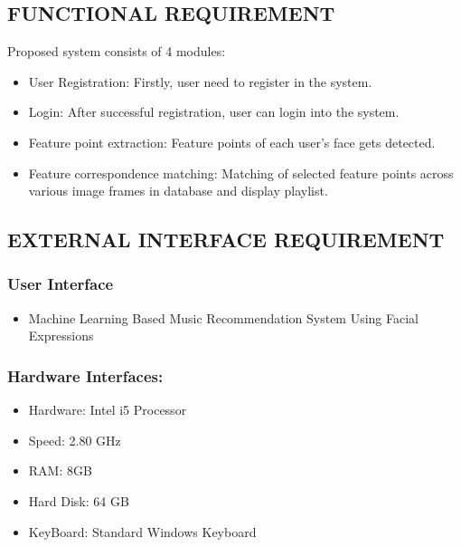 \documentclass[12pt]{report}
\begin{document}
\centering
\raggedright
\subsection{ FUNCTIONAL REQUIREMENT}

\justifying
\setlength{\parindent}{4em}
\setlength{\parskip}{0.5em}
\renewcommand{\baselinestretch}{1.5}

\normalsize Proposed system consists of 4 modules:
\begin{itemize}\item User Registration: Firstly, user need to register in the system.
\item Login: After successful registration, user can login into the system.
\item Feature point extraction: Feature points of each user’s face gets detected.
\item Feature correspondence matching: Matching of selected feature points across
various image frames in database and display playlist.

\end{itemize}
\centering
\raggedright
\subsection{ EXTERNAL INTERFACE REQUIREMENT}

\justifying
\setlength{\parindent}{4em}
\setlength{\parskip}{0.5em}
\renewcommand{\baselinestretch}{1.5}
\subsubsection{ User Interface}
\normalsize\begin{itemize}\item  Machine Learning Based Music Recommendation System Using Facial 
Expressions
\end{itemize}
\subsubsection{ Hardware Interfaces:}
\normalsize\begin{itemize}\item   Hardware: Intel i5 Processor
\item  Speed: 2.80 GHz
\item  RAM: 8GB
\item  Hard Disk: 64 GB
\item  KeyBoard: Standard Windows Keyboard
\end{itemize}
\end{document}
